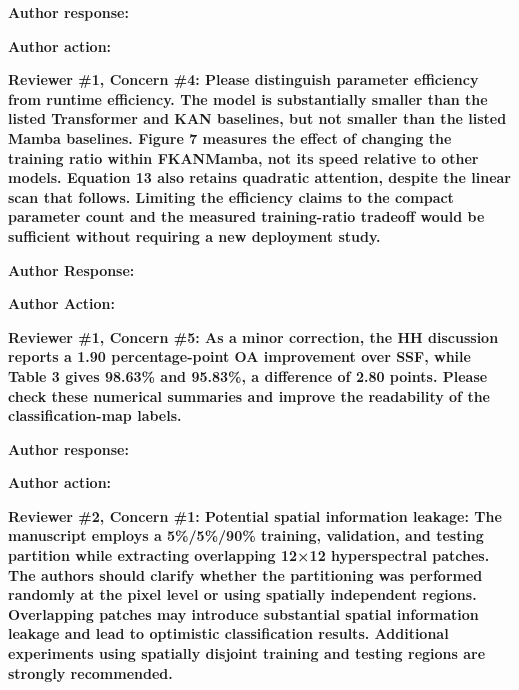 \documentclass[a4paper,onecolumn,11pt]{IEEEtran}
\begin{document}
\textbf{Author response:}



\textbf{Author action:}



\vspace{2em}

{\color{reviewgreen}\textbf{Reviewer \#1, Concern \#4: Please distinguish parameter efficiency from runtime efficiency. The model is substantially smaller than the listed Transformer and KAN baselines, but not smaller than the listed Mamba baselines. Figure 7 measures the effect of changing the training ratio within FKANMamba, not its speed relative to other models. Equation 13 also retains quadratic attention, despite the linear scan that follows. Limiting the efficiency claims to the compact parameter count and the measured training-ratio tradeoff would be sufficient without requiring a new deployment study.
}}

\textbf{Author Response:}



\textbf{Author Action:}



\vspace{1.5em}

{\color{reviewgreen}\textbf{Reviewer \#1, Concern \#5: As a minor correction, the HH discussion reports a 1.90 percentage-point OA improvement over SSF, while Table 3 gives 98.63\% and 95.83\%, a difference of 2.80 points. Please check these numerical summaries and improve the readability of the classification-map labels.
}}



\textbf{Author response:}



\textbf{Author action:}



\vspace{2em}

{\color{reviewgreen}\textbf{Reviewer \#2, Concern \#1: Potential spatial information leakage: The manuscript employs a 5\%/5\%/90\% training, validation, and testing partition while extracting overlapping 12×12 hyperspectral patches. The authors should clarify whether the partitioning was performed randomly at the pixel level or using spatially independent regions. Overlapping patches may introduce substantial spatial information leakage and lead to optimistic classification results. Additional experiments using spatially disjoint training and testing regions are strongly recommended.
}}
\end{document}
